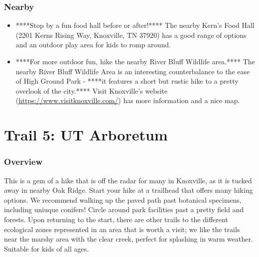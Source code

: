 \documentclass[
  letterpaper,
  DIV=11,
  numbers=noendperiod]{scrreprt}
\providecommand{\tightlist}{%
  \setlength{\itemsep}{0pt}\setlength{\parskip}{0pt}}\usepackage{longtable,booktabs,array}
\begin{document}
\subsection{Nearby}\label{nearby-3}

\begin{itemize}
\tightlist
\item
  ****Stop by a fun food hall before or after!**** The nearby Kern's
  Food Hall (2201 Kerns Rising Way, Knoxville, TN 37920) has a good
  range of options and an outdoor play area for kids to romp around.
\item
  ****For more outdoor fun, hike the nearby River Bluff Wildlife
  area.**** The nearby River Bluff Wildlife Area is an interesting
  counterbalance to the ease of High Ground Park - ****it features a
  short but rustic hike to a pretty overlook of the city.**** Visit
  Knoxville's website (\url{https://www.visitknoxville.com/}) has more
  information and a nice map.
\end{itemize}

\chapter{Trail 5: UT Arboretum}\label{trail-5-ut-arboretum}

\subsection{Overview}\label{overview-5}

This is a gem of a hike that is off the radar for many in Knoxville, as
it is tucked away in nearby Oak Ridge. Start your hike at a trailhead
that offers many hiking options. We recommend walking up the paved path
past botanical specimens, including uniuque conifers! Circle around park
facilities past a pretty field and forests. Upon returning to the start,
there are other trails to the different ecological zones represented in
an area that is worth a visit; we like the trails near the marshy area
with the clear creek, perfect for splashing in warm weather. Suitable
for kids of all ages.
\end{document}
